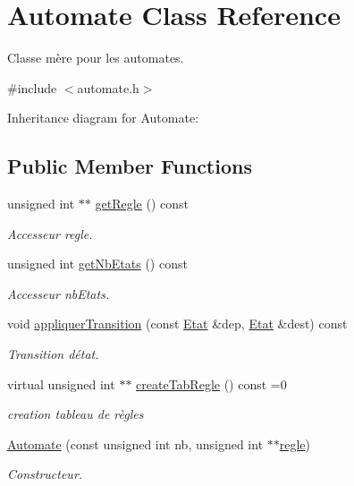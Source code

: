 \hypertarget{class_automate}{}\section{Automate Class Reference}
\label{class_automate}


Classe mère pour les automates.  




{\ttfamily \#include $<$automate.\+h$>$}



Inheritance diagram for Automate\+:
\subsection*{Public Member Functions}
\begin{DoxyCompactItemize}
\item 
unsigned int $\ast$$\ast$ \mbox{\hyperlink{class_automate_a81f06f8d3508ca3fbb86740bb67cde18}{get\+Regle}} () const
\begin{DoxyCompactList}\small\item\em Accesseur regle. \end{DoxyCompactList}\item 
unsigned int \mbox{\hyperlink{class_automate_a99fb6a12fdbf9a678b5ae894ff88e235}{get\+Nb\+Etats}} () const
\begin{DoxyCompactList}\small\item\em Accesseur nb\+Etats. \end{DoxyCompactList}\item 
void \mbox{\hyperlink{class_automate_a7d42c21ad3146b499746fef5dc74d973}{appliquer\+Transition}} (const \mbox{\hyperlink{class_etat}{Etat}} \&dep, \mbox{\hyperlink{class_etat}{Etat}} \&dest) const
\begin{DoxyCompactList}\small\item\em Transition d\textquotesingle{}état. \end{DoxyCompactList}\item 
virtual unsigned int $\ast$$\ast$ \mbox{\hyperlink{class_automate_a5c625d4aea9454fb83f305f59e964884}{create\+Tab\+Regle}} () const =0
\begin{DoxyCompactList}\small\item\em creation tableau de règles \end{DoxyCompactList}\item 
\mbox{\hyperlink{class_automate_a636ba5dc9c4cc901b021326d124517e1}{Automate}} (const unsigned int nb, unsigned int $\ast$$\ast$\mbox{\hyperlink{class_automate_a7f9e28d421ef41372273778f182e8f22}{regle}})
\begin{DoxyCompactList}\small\item\em Constructeur. \end{DoxyCompactList}\end{DoxyCompactItemize}
